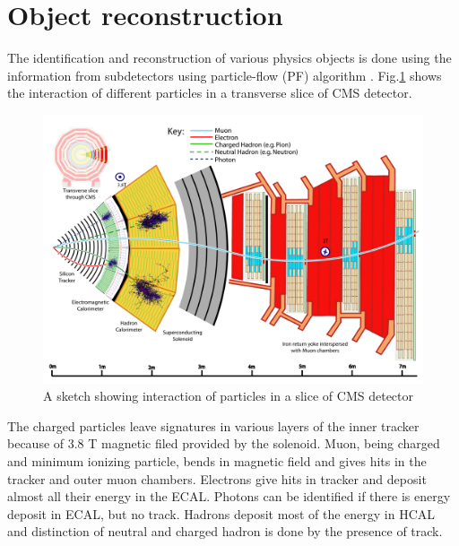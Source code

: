 \section{Object reconstruction}
The identification and reconstruction of various physics objects is done using the information from subdetectors using particle-flow (PF) algorithm \cite{CMS-PRF-14-001}. Fig.\ref{fig:CMS_PF} shows the interaction of different particles in a transverse slice of CMS detector.
\begin{figure}[h!]
\centering
\includegraphics[width=0.95\linewidth]{../Figures/Chap2/CMS_PF}
\caption[Particle interaction in CMS]{A sketch showing interaction of particles in a slice of CMS detector}
\label{fig:CMS_PF}
\end{figure}
The charged particles leave signatures in various layers of the inner tracker because of 3.8 T magnetic filed provided by the solenoid. Muon, being charged and minimum ionizing particle, bends in magnetic field and gives hits in the tracker and outer muon chambers. Electrons give hits in tracker and deposit almost all their energy in the ECAL. Photons can be identified if there is energy deposit in ECAL, but no track. Hadrons deposit most of the energy in HCAL and distinction of neutral and charged hadron is done by the presence of track.

